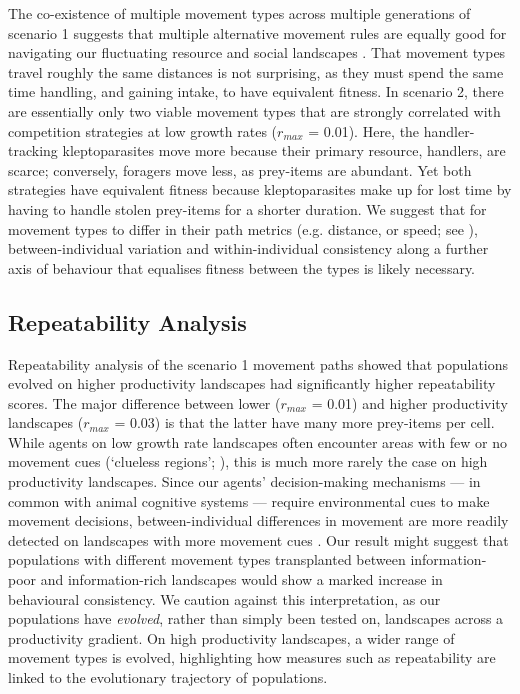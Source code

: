     The co-existence of multiple movement types across multiple generations of scenario 1 suggests that multiple alternative movement rules are equally good for navigating our fluctuating resource and social landscapes \citep[see also][]{getz2015,netz2021}.
    That movement types travel roughly the same distances is not surprising, as they must spend the same time handling, and gaining intake, to have equivalent fitness.
    In scenario 2, there are essentially only two viable movement types that are strongly correlated with competition strategies at low growth rates ($r_{max}$ = 0.01).
    Here, the handler-tracking kleptoparasites move more because their primary resource, handlers, are scarce; conversely, foragers move less, as prey-items are abundant.
    Yet both strategies have equivalent fitness because kleptoparasites make up for lost time by having to handle stolen prey-items for a shorter duration.
    We suggest that for movement types to differ in their path metrics (e.g. distance, or speed; see \citealt{abrahms2017}), between-individual variation and within-individual consistency along a further axis of behaviour that equalises fitness between the types is likely necessary.
    
    \subsection*{Repeatability Analysis}
    
    Repeatability analysis of the scenario 1 movement paths showed that populations evolved on higher productivity landscapes had significantly higher repeatability scores.
    The major difference between lower ($r_{max}$ = 0.01) and higher productivity landscapes ($r_{max}$ = 0.03) is that the latter have many more prey-items per cell.
    While agents on low growth rate landscapes often encounter areas with few or no movement cues (`clueless regions'; \citealt{perkins1992}), this is much more rarely the case on high productivity landscapes.
    Since our agents' decision-making mechanisms --- in common with animal cognitive systems --- require environmental cues to make movement decisions, between-individual differences in movement are more readily detected on landscapes with more movement cues \citep[see][]{carter2013a}.
    Our result might suggest that populations with different movement types transplanted between information-poor and information-rich landscapes would show a marked increase in behavioural consistency.
    We caution against this interpretation, as our populations have \textit{evolved}, rather than simply been tested on, landscapes across a productivity gradient.
    On high productivity landscapes, a wider range of movement types is evolved, highlighting how measures such as repeatability are linked to the evolutionary trajectory of populations.
    
